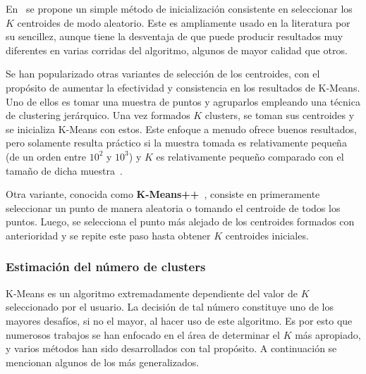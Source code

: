 En~\cite{MacQueen67} se propone un simple método de inicialización consistente en seleccionar los $K$ centroides de modo aleatorio.
Este es ampliamente usado en la literatura por su sencillez, aunque tiene la desventaja de que puede producir resultados muy diferentes en varias corridas del algoritmo, algunos de mayor calidad que otros.

Se han popularizado otras variantes de selección de los centroides, con el propósito de aumentar la efectividad y consistencia en los resultados de K-Means.
Uno de ellos es tomar una muestra de puntos y agruparlos empleando una técnica de clustering jerárquico.
Una vez formados $K$ clusters, se toman sus centroides y se inicializa K-Means con estos.
Este enfoque a menudo ofrece buenos resultados, pero solamente resulta práctico si la muestra tomada es relativamente pequeña (de un orden entre $10^2$ y $10^3$) y $K$ es relativamente pequeño comparado con el tamaño de dicha muestra~\cite{Tan05}.

Otra variante, conocida como \textbf{K-Means++}~\cite{Arthur07}, consiste en primeramente seleccionar un punto de manera aleatoria o tomando el centroide de todos los puntos.
Luego, se selecciona el punto más alejado de los centroides formados con anterioridad y se repite este paso hasta obtener $K$ centroides iniciales.

\subsubsection{Estimación del número de clusters}

K-Means es un algoritmo extremadamente dependiente del valor de $K$ seleccionado por el usuario.
La decisión de tal número constituye uno de los mayores desafíos, si no el mayor, al hacer uso de este algoritmo.
Es por esto que numerosos trabajos se han enfocado en el área de determinar el $K$ más apropiado, y varios métodos han sido desarrollados con tal propósito.
A continuación se mencionan algunos de los más generalizados.

